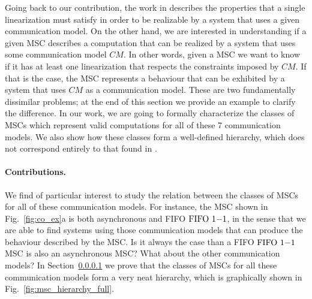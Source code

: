 

Going back to our contribution, the work in \cite{DBLP:journals/fac/ChevrouHQ16} describes the properties that a single linearization must satisfy in order to be realizable by a system that uses a given communication model. On the other hand, we are interested in understanding if a given MSC describes a computation that can be realized by a system that uses some communication model $CM$. In other words, given a MSC we want to know if it has at least one linearization that respects the constraints imposed by $CM$. If that is the case, the MSC represents a behaviour that can be exhibited by a system that uses $CM$ as a communication model. These are two fundamentally dissimilar problems; at the end of this section we provide an example to clarify the difference. In our work, we are going to formally characterize the classes of MSCs which represent valid computations for all of these 7 communication models. We also show how these classes form a well-defined hierarchy, which does not correspond entirely to that found in \cite{DBLP:journals/fac/ChevrouHQ16}.


\paragraph{Contributions.}

We find of particular interest to study the relation between the classes of MSCs for all of these communication models. For instance, the MSC shown in Fig.~\ref{fig:co_ex}a is both asynchronous and FIFO $\text{FIFO } 1\mathsf{-}1$, in the sense that we are able to find systems using those communication models that can produce the behaviour described by the MSC. Is it always the case than a FIFO $\text{FIFO } 1\mathsf{-}1$ MSC is also an asynchronous MSC? What about the other communication models? In Section~\ref{} we prove that the classes of MSCs for all these communication models form a very neat hierarchy, which is graphically shown in Fig.~\ref{fig:msc_hierarchy_full}.



